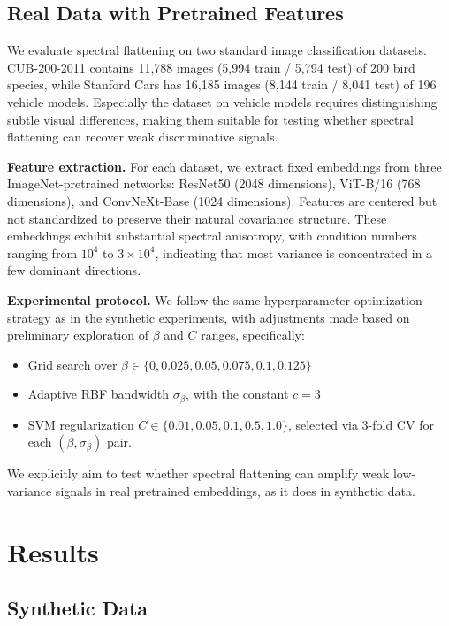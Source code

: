 \documentclass{article}
\begin{document}
\subsection{Real Data with Pretrained Features}

We evaluate spectral flattening on two standard image classification datasets. CUB-200-2011 contains 11,788 images (5,994 train / 5,794 test) of 200 bird species, while Stanford Cars has 16,185 images (8,144 train / 8,041 test) of 196 vehicle models. Especially the dataset on vehicle models requires distinguishing subtle visual differences, making them suitable for testing whether spectral flattening can recover weak discriminative signals.

\textbf{Feature extraction.} For each dataset, we extract fixed embeddings from three ImageNet-pretrained networks: ResNet50 (2048 dimensions), ViT-B/16 (768 dimensions), and ConvNeXt-Base (1024 dimensions). Features are centered but not standardized to preserve their natural covariance structure. These embeddings exhibit substantial spectral anisotropy, with condition numbers ranging from \(10^4\) to \(3\times 10^4\), indicating that most variance is concentrated in a few dominant directions.

\textbf{Experimental protocol.} We follow the same hyperparameter optimization strategy as in the synthetic experiments, with adjustments made based on preliminary exploration of $\beta$ and $C$ ranges, specifically:
\begin{itemize}
    \item Grid search over \(\beta \in \{0,0.025,0.05,0.075,0.1,0.125\}\)
    \item Adaptive RBF bandwidth \(\sigma_\beta\), with the constant \(c=3\)
    \item SVM regularization \(C \in \{0.01,0.05,0.1,0.5,1.0\}\), selected via 3-fold CV for each \((\beta, \sigma_\beta)\) pair.
\end{itemize}

We explicitly aim to test whether spectral flattening can amplify weak low-variance signals in real pretrained embeddings, as it does in synthetic data.

\section{Results}

\subsection{Synthetic Data}
\end{document}
